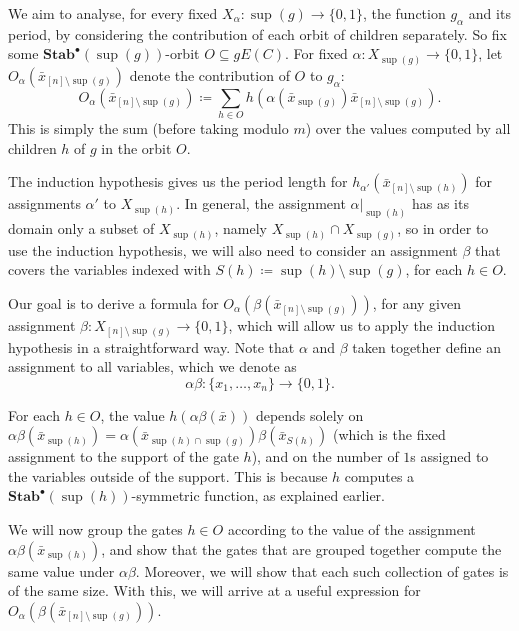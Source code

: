 \documentclass[11pt]{article}
\DeclareMathOperator{\supp}{sup}
\newcommand{\StabP}{\mathbf{Stab}^{\bullet}}
\theoremstyle{definition}
\theoremstyle{plain}
\theoremstyle{remark}
\theoremstyle{remark}
\begin{document}
We aim to analyse, for every fixed $X_{\alpha} \colon \supp(g) \to \{0,1\}$, the function $g_\alpha$ and its period, by considering the contribution of each orbit of children separately. 
So fix some $\StabP(\supp(g))$-orbit $O \subseteq gE(C)$. For fixed $\alpha \colon X_{\supp(g)} \to \{0,1\}$, let $O_\alpha(\bar{x}_{[n] \setminus \supp(g)})$ denote the contribution of $O$ to $g_\alpha$:
\[
O_\alpha(\bar{x}_{[n] \setminus \supp(g)}) \coloneqq \sum_{h \in O} h(\alpha(\bar{x}_{\supp(g)})\bar{x}_{[n] \setminus\supp(g)}).
\]
This is simply the sum (before taking modulo $m$) over the values computed by all children $h$ of $g$ in the orbit $O$. 

The induction hypothesis gives us the period length for $h_{\alpha'}(\bar{x}_{[n] \setminus \supp(h)})$ for assignments $\alpha'$ to $X_{\supp(h)}$. In general, the assignment $\alpha|_{\supp(h)}$ has as its domain only a subset of $X_{\supp(h)}$, namely $X_{\supp(h)} \cap X_{\supp(g)}$, so in order to use the induction hypothesis, we will also need to consider an assignment $\beta$ that covers the variables indexed with $S(h) \coloneqq \supp(h) \setminus \supp(g)$, for each $h \in O$. 



Our goal is to derive a formula for $O_\alpha(\beta(\bar{x}_{[n] \setminus \sup(g)}))$, for any given assignment $\beta \colon X_{[n] \setminus \sup(g)} \to \{0,1\}$, which will allow us to apply the induction hypothesis in a straightforward way. Note that $\alpha$ and $\beta$ taken together define an assignment to all variables, which we denote as 
\[
\alpha\beta \colon \{x_1, \dots, x_n\} \to \{0,1\}.
\]


For each $h \in O$, the value $h(\alpha\beta(\bar{x}))$
depends solely on $\alpha\beta(\bar{x}_{\supp(h)}) = \alpha(\bar{x}_{\supp(h) \cap \supp(g)})\beta(\bar{x}_{S(h)})$ (which is the fixed assignment to the support of the gate $h$), and on the number of $1$s assigned to the variables outside of the support. This is because $h$ computes a $\StabP(\supp(h))$-symmetric function, as explained earlier. 

We will now group the gates $h \in O$ according to the value of the assignment $\alpha\beta(\bar{x}_{\supp(h)})$, and show that the gates that are grouped together compute the same value under $\alpha\beta$. Moreover, we will show that each such collection of gates is of the same size. With this, we will arrive at a useful expression for $O_\alpha(\beta(\bar{x}_{[n] \setminus \supp(g)}))$.\\
\end{document}
